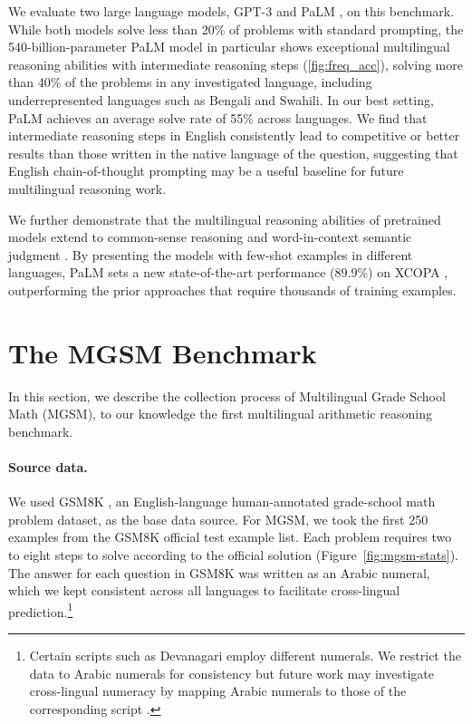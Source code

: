 We evaluate two large language models, GPT-3 \citep{brown2020language,ouyang2022training} and PaLM \citep{chowdhery2022palm}, on this benchmark. While both models solve less than 20\% of problems with standard prompting, the 540-billion-parameter PaLM model in particular shows exceptional multilingual reasoning abilities with intermediate reasoning steps (\ref{fig:freq_acc}), solving more than 40\% of the problems in any investigated language, including underrepresented languages such as Bengali and Swahili. In our best setting, PaLM achieves an average solve rate of 55\% across languages. We find that intermediate reasoning steps in English consistently lead to competitive or better results than those written in the native language of the question, suggesting that English chain-of-thought prompting may be a useful baseline for future multilingual reasoning work.

We further demonstrate that the multilingual reasoning abilities of pretrained models extend to common-sense reasoning \citep{ponti-etal-2020-xcopa} and word-in-context semantic judgment \citep{raganato-etal-2020-xl}. By presenting the models with few-shot examples in different languages, PaLM sets a new state-of-the-art performance ($89.9\%$) on {XCOPA} \citep{ponti-etal-2020-xcopa}, outperforming the prior approaches that require thousands of training examples.

\section{The {MGSM} Benchmark}

\label{sec:dataset-mgsm}
In this section, we describe the collection process of Multilingual Grade School Math ({MGSM}), to our knowledge the first multilingual arithmetic reasoning benchmark.

\paragraph{Source data.} We used GSM8K \citep{cobbe2021training}, an English-language human-annotated grade-school math problem dataset, as the base data source. For {MGSM}, we took the first 250 examples from the GSM8K official test example list. Each problem requires two to eight steps to solve according to the official solution (Figure~\ref{fig:mgsm-stats}).
The answer for each question in GSM8K was written as an Arabic numeral, which we kept consistent across all languages to facilitate cross-lingual prediction.\footnote{Certain scripts such as Devanagari employ different numerals. We restrict the data to Arabic numerals for consistency but future work may investigate cross-lingual numeracy by mapping Arabic numerals to those of the corresponding script \citep[see][]{spithourakis-riedel-2018-numeracy}.}

